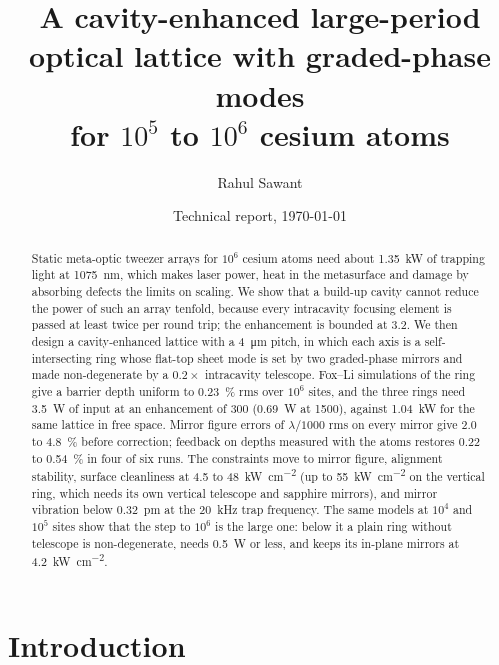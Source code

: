 \documentclass[11pt]{article}
\title{A cavity-enhanced large-period optical lattice with graded-phase modes\\
for $10^{5}$ to $10^{6}$ cesium atoms}
\author{Rahul Sawant\\\placeholder{[CONFIRM?: co-authors and affiliation]}}
\date{Technical report, \today}
\begin{document}
\maketitle

\begin{abstract}
Static meta-optic tweezer arrays for $10^{6}$ cesium atoms need about \SI{1.35}{\kilo\watt} of
trapping light at \SI{1075}{\nano\metre}, which makes laser power, heat in the metasurface and
damage by absorbing defects the limits on scaling. We show that a build-up cavity cannot reduce the
power of such an array tenfold, because every intracavity focusing element is passed at least twice
per round trip; the enhancement is bounded at 3.2. We then design a cavity-enhanced lattice with a
\SI{4}{\micro\metre} pitch, in which each axis is a self-intersecting ring whose flat-top sheet mode
is set by two graded-phase mirrors and made non-degenerate by a $0.2\times$ intracavity telescope.
Fox--Li simulations of the ring give a barrier depth uniform to \SI{0.23}{\percent} rms over
$10^{6}$ sites, and the three rings need \SI{3.5}{\watt} of input at an enhancement of 300
(\SI{0.69}{\watt} at 1500), against \SI{1.04}{\kilo\watt} for the same lattice in free space.
Mirror figure errors of $\lambda/1000$ rms on every mirror give 2.0 to \SI{4.8}{\percent} before
correction; feedback on depths measured with the atoms restores 0.22 to \SI{0.54}{\percent} in four of
six runs. The constraints move to mirror figure, alignment stability, surface cleanliness at 4.5 to
\SI{48}{\kilo\watt\per\centi\metre\squared} (up to \SI{55}{\kilo\watt\per\centi\metre\squared} on the
vertical ring, which needs its own vertical telescope and sapphire mirrors), and mirror vibration below \SI{0.32}{\pico\metre}\rtHz{} at the
\SI{20}{\kilo\hertz} trap frequency. The same models at $10^{4}$ and $10^{5}$ sites show that the step to
$10^{6}$ is the large one: below it a plain ring without telescope is non-degenerate, needs \SI{0.5}{\watt}
or less, and keeps its in-plane mirrors at \SI{4.2}{\kilo\watt\per\centi\metre\squared}.
\end{abstract}

\tableofcontents

\section{Introduction}
\label{sec:intro}
\end{document}
